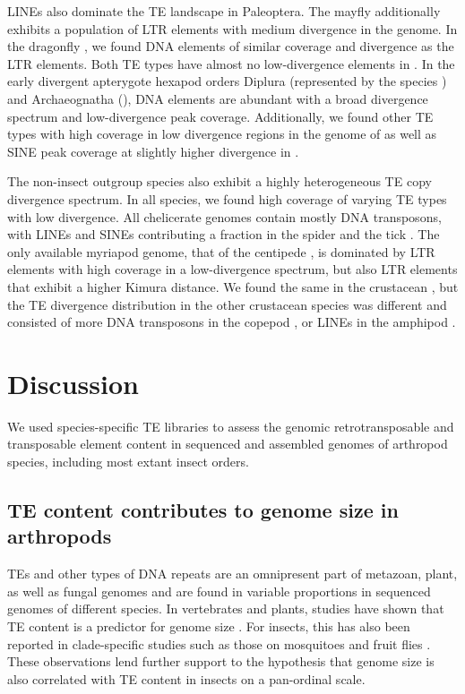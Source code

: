 LINEs also dominate the TE landscape in Paleoptera. The mayfly
 additionally exhibits a population of LTR elements
with medium divergence in the genome. In the dragonfly , we found DNA elements of similar coverage and divergence as the
LTR elements. Both TE types have almost no low-divergence elements in
. In the early divergent apterygote hexapod orders
Diplura (represented by the species ) and
Archaeognatha (), DNA elements are abundant
with a broad divergence spectrum and low-divergence peak coverage.
Additionally, we found other TE types with high coverage in low
divergence regions in the genome of  as well as
SINE peak coverage at slightly higher divergence in .

The non-insect outgroup species also exhibit a highly heterogeneous TE
copy divergence spectrum. In all species, we found high coverage of
varying TE types with low divergence. All chelicerate genomes contain
mostly DNA transposons, with LINEs and SINEs contributing a fraction in
the spider  and the tick . The only available myriapod genome, that of the centipede
, is dominated by LTR elements with high
coverage in a low-divergence spectrum, but also LTR elements that
exhibit a higher Kimura distance. We found the same in the crustacean
, but the TE divergence distribution in the other
crustacean species was different and consisted of more DNA transposons
in the copepod , or LINEs in the amphipod
.

\section{Discussion}\label{discussion}

We used species-specific TE libraries to assess the genomic
retrotransposable and transposable element content in sequenced and
assembled genomes of arthropod species, including most extant insect
orders.

\subsection{TE content contributes to genome size in
arthropods}\label{te-content-contributes-to-genome-size-in-arthropods}

TEs and other types of DNA repeats are an omnipresent part of metazoan,
plant, as well as fungal genomes and are found in variable proportions
in sequenced genomes of different species. In vertebrates and plants,
studies have shown that TE content is a predictor for genome size
\citep{Chalopin2015,Staton2015}. For insects, this has also been
reported in clade-specific studies such as those on mosquitoes
\citep{Neafsey2014} and  fruit flies
\citep{Sessegolo2016}. These observations lend further support to the
hypothesis that genome size is also correlated with TE content in
insects on a pan-ordinal scale.

